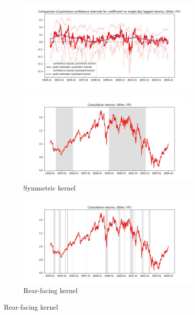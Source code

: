 \documentclass{article}
\begin{document}
\newpage

\begin{figure}

\centering

  \begin{subfigure}[b]{\textwidth}
    \includegraphics[width=\textwidth]{Other/pointwiseCIs_layered_FF5.jpg}
    \label{fig:1}
  \end{subfigure}
  \begin{subfigure}[b]{0.45\textwidth}
    \includegraphics[width=\textwidth]{Other/full_cumrets_ofint_FF5.jpg}
    \caption*{Symmetric kernel}
    \label{fig:2}
  \end{subfigure}
   \begin{subfigure}[b]{0.45\textwidth}
    \includegraphics[width=\textwidth]{Other/bwunif_full_cumrets_ofint_FF5.jpg}
    \caption*{Rear-facing kernel}
    \label{fig:2}
  \end{subfigure}
  
\end{figure}
\end{document}
